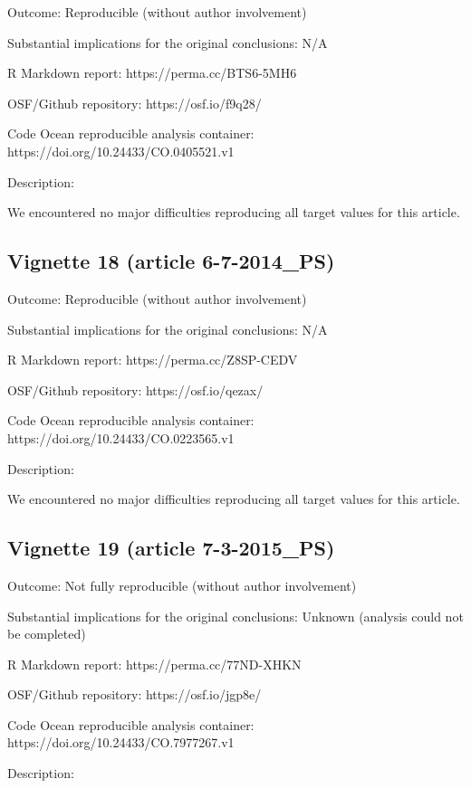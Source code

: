 \begin{appendix}
Outcome: Reproducible (without author involvement)

Substantial implications for the original conclusions: N/A

R Markdown report: https://perma.cc/BTS6-5MH6

OSF/Github repository: https://osf.io/f9q28/

Code Ocean reproducible analysis container:
https://doi.org/10.24433/CO.0405521.v1

Description:

We encountered no major difficulties reproducing all target values for
this article.

\hypertarget{vignette-18-article-6-7-2014_ps}{%
\subsection{Vignette 18 (article
6-7-2014\_PS)}\label{vignette-18-article-6-7-2014_ps}}

Outcome: Reproducible (without author involvement)

Substantial implications for the original conclusions: N/A

R Markdown report: https://perma.cc/Z8SP-CEDV

OSF/Github repository: https://osf.io/qezax/

Code Ocean reproducible analysis container:
https://doi.org/10.24433/CO.0223565.v1

Description:

We encountered no major difficulties reproducing all target values for
this article.

\hypertarget{vignette-19-article-7-3-2015_ps}{%
\subsection{Vignette 19 (article
7-3-2015\_PS)}\label{vignette-19-article-7-3-2015_ps}}

Outcome: Not fully reproducible (without author involvement)

Substantial implications for the original conclusions: Unknown (analysis
could not be completed)

R Markdown report: https://perma.cc/77ND-XHKN

OSF/Github repository: https://osf.io/jgp8e/

Code Ocean reproducible analysis container:
https://doi.org/10.24433/CO.7977267.v1

Description:


\end{appendix}
